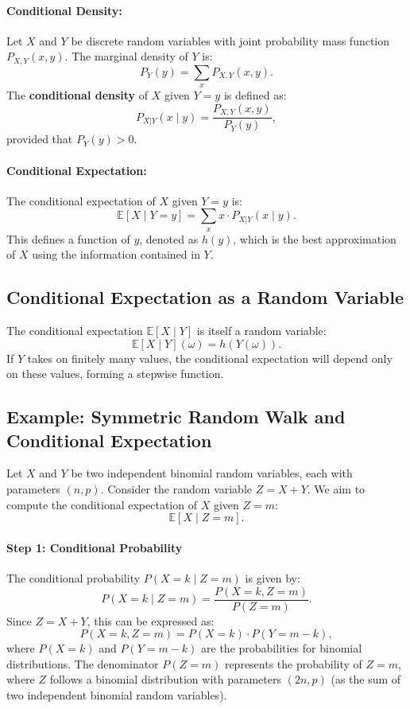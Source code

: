 \paragraph{Conditional Density:}
Let \(X\) and \(Y\) be discrete random variables with joint probability mass function \(P_{X,Y}(x, y)\). The marginal density of \(Y\) is:
\[
P_Y(y) = \sum_x P_{X,Y}(x, y).
\]
The \textbf{conditional density} of \(X\) given \(Y=y\) is defined as:
\[
P_{X|Y}(x \mid y) = \frac{P_{X,Y}(x, y)}{P_Y(y)},
\]
provided that \(P_Y(y) > 0\). 

\paragraph{Conditional Expectation:}
The conditional expectation of \(X\) given \(Y=y\) is:
\[
\mathbb{E}[X \mid Y=y] = \sum_x x \cdot P_{X|Y}(x \mid y).
\]
This defines a function of \(y\), denoted as \(h(y)\), which is the best approximation of \(X\) using the information contained in \(Y\).

\subsection{Conditional Expectation as a Random Variable}
The conditional expectation \(\mathbb{E}[X \mid Y]\) is itself a random variable:
\[
\mathbb{E}[X \mid Y](\omega) = h(Y(\omega)).
\]
If \(Y\) takes on finitely many values, the conditional expectation will depend only on these values, forming a stepwise function.

\subsection{Example: Symmetric Random Walk and Conditional Expectation}
Let \(X\) and \(Y\) be two independent binomial random variables, each with parameters \((n, p)\). Consider the random variable \(Z = X + Y\). We aim to compute the conditional expectation of \(X\) given \(Z = m\):
\[
\mathbb{E}[X \mid Z=m].
\]

\paragraph{Step 1: Conditional Probability}
The conditional probability \(P(X = k \mid Z = m)\) is given by:
\[
P(X = k \mid Z = m) = \frac{P(X = k, Z = m)}{P(Z = m)}.
\]
Since \(Z = X + Y\), this can be expressed as:
\[
P(X = k, Z = m) = P(X = k) \cdot P(Y = m-k),
\]
where \(P(X = k)\) and \(P(Y = m-k)\) are the probabilities for binomial distributions. The denominator \(P(Z = m)\) represents the probability of \(Z = m\), where \(Z\) follows a binomial distribution with parameters \((2n, p)\) (as the sum of two independent binomial random variables).

